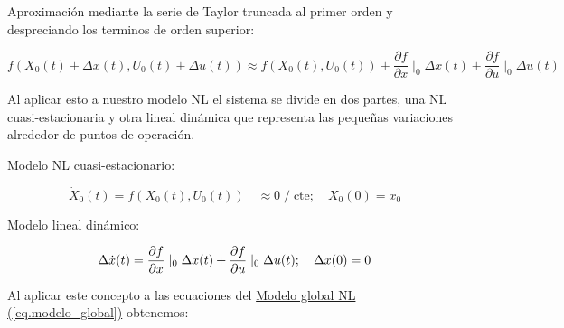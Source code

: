 \documentclass{article}
\begin{document}
Aproximación mediante la serie de Taylor truncada al primer orden y despreciando los terminos
de orden superior:

\begin{equation}
    f(X_{0}(t) + \Delta x(t), U_{0}(t) + \Delta u (t)) \approx f(X_{0}(t), U_{0}(t)) + \frac{\partial f}{\partial x}\mid_{0}\Delta x(t) + \frac{\partial f}{\partial u}\mid_{0}\Delta u(t)
\end{equation}

Al aplicar esto a nuestro modelo NL el sistema se divide en dos partes, una NL cuasi-estacionaria y otra 
lineal dinámica que representa las pequeñas variaciones alrededor de puntos de operación.

Modelo NL cuasi-estacionario:

\begin{equation}
    \dot{X}_{0}(t) = f(X_{0}(t), U_{0}(t)) \quad \approx 0 \;/\; \text{cte}; \quad X_{0}(0) = x_{0}
\end{equation}

Modelo lineal dinámico:

\begin{equation}
    \Delta\dot{x}(t) = \frac{\partial f}{\partial x}\mid_{0}\Delta x(t) + \frac{\partial f}{\partial u}\mid_{0}\Delta u(t); \quad \Delta x(0) = 0\\
\end{equation}

Al aplicar este concepto a las ecuaciones del
\hyperref[eq.modelo_global]{Modelo global NL (\ref*{eq.modelo_global})}
obtenemos:
\end{document}
